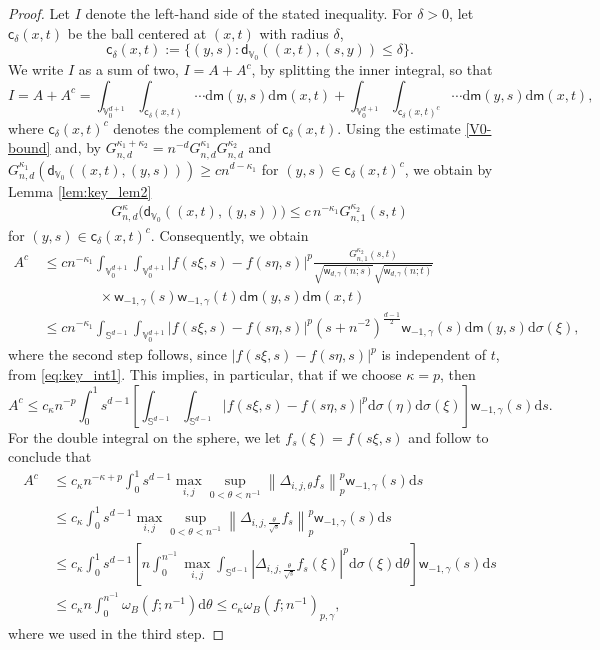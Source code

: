 \documentclass{amsart}
\theoremstyle{remark}
\def\d{\mathrm{d}}
\def\sph{{\mathbb{S}^{d-1}}}
\def\g{{\gamma}}
\def\k{{\kappa}}
\def\t{{\theta}}
\def\s{\sigma}
\def\VV{{\mathbb V}}
\def\d{\mathrm{d}}
\def\sph{{\mathbb{S}^{d-1}}}
\def\sc{{\mathsf c}}
\def\sd{{\mathsf d}}
\def\sm{{\mathsf m}}
\def\sw{{\mathsf w}}
\def\g{{\gamma}}
\def\k{{\kappa}}
\def\t{{\theta}}
\def\s{\sigma}
\def\VV{{\mathbb V}}
\def\f{\frac}
\def\f{\frac}
\begin{document}
\begin{proof}
Let $I$ denote the left-hand side of the stated inequality. For $\delta > 0$, let $\sc_\delta(x,t)$ be the ball
centered at $(x,t)$ with radius $\delta$, 
$$\sc_\delta(x,t):= \{(y,s): \sd_{\VV_0}((x,t), (s,y))\le \delta\}.
$$
We write $I$ as a sum of two, $I = A+A^c$, by splitting the inner integral, so that 
$$
   I = A + A^c = \int_{\VV_0^{d+1}}  \int_{\sc_\delta (x,t)} \cdots \d\sm(y,s)  \d \sm(x,t)+ 
      \int_{\VV_0^{d+1}} \int_{\sc_\delta (x,t)^c} \cdots \d\sm(y,s)   \d \sm(x,t),
$$
where $\sc_\delta (x,t)^c$ denotes the complement of $\sc_\delta (x,t)$. Using the estimate \eqref{V0-bound}
and, by $G_{n,d}^{\k_1+\k_2} =  n^{-d} G_{n,d}^{\k_1} G_{n,d}^{\k_2}$ and 
$G_{n,d}^{\k_1} ( \sd_{\VV_0}((x,t), (y,s))) \ge c n^{d-\k_1}$ for $(y,s) \in \sc_\delta (x,t)^c$,  we obtain by
Lemma \ref{lem:key_lem2}  
\begin{align*}
  G_{n,d}^\k \big( \sd_{\VV_0}((x,t), (y,s)) \big) \le c\, n^{-\k_1} G_{n,1}^{\k_2}(s,t)
\end{align*}
for $(y,s) \in \sc_\delta (x,t)^c$. Consequently, we obtain 
\begin{align*}
A^c \, & \le  c n^{-\k_1}  \int_{\VV_0^{d+1}} \int_{\VV_{0}^{d+1}} 
            |f(s\xi,s) - f(s\eta,s)|^p  \frac{G_{n,1}^{\k_2}(s,t)}{ \sqrt{ \sw_{d,\g}(n;s)}\sqrt{\sw_{d,\g}(n;t)}} \\
    & \qquad\qquad \times  \sw_{-1,\gamma}(s) \sw_{-1,\gamma}(t)\d \sm(y,s) \d \sm(x,t) \\
     & \le  c n^{-\k_1} 
   \int_{\sph} \int_{\VV_{0}^{d+1}}  |f(s\xi,s) - f(s\eta,s)|^p (s+n^{-2})^{\f{d-1}{2}}   \sw_{-1,\gamma}(s) \d \sm(y,s) \d \s(\xi),
\end{align*}
where the second step follows, since $|f(s\xi,s) - f(s\eta,s)|^p$ is independent of $t$, from \eqref{eq:key_int1}. 
This implies, in particular, that if we choose $\k = p$, then 
$$
  A^c \le c_\k n^{-p} \int_{0}^1s^{d-1} \left[ \int_{\sph} \int_{\sph}  |f(s\xi,s) - f(s\eta,s)|^p  \d \s(\eta) \d \s(\xi) \right] \sw_{-1,\gamma}(s) \d s.
$$ 
For the double integral on the sphere, we let $f_s (\xi) = f(s \xi,s)$ and follow \cite[p. 90]{DaiX} to conclude that 
\begin{align*}
  A^c \, & \le c_\k n^{-\k+p} \int_0^1 s^{d-1} \max_{i, j} \sup_{0< \t<n^{-1}} \left\| \Delta_{i,j,\t} f_s \right\|_p^p \sw_{-1,\g}(s) \d s \\
   & \le c_\k   \int_0^1 s^{d-1} \max_{i, j} \sup_{0< \t<n^{-1}} \left\| \Delta_{i,j,\frac{\t}{\sqrt{s}}} f_s \right\|_p^p \sw_{-1,\g}(s) \d s \\
    & \le c_\k  \int_0^1 s^{d-1} \left[n \int_0^{n^{-1}} \max_{i,j} \int_\sph |\Delta_{i,j,\frac{\t}{\sqrt{s}}} 
         f_s(\xi)|^p \d \s(\xi) \d \t \right]  \sw_{-1,\g}(s) \d s \\
    & \le c_\k   n \int_0^{n^{-1}} \omega_B(f;n^{-1}) \d \t \le c_\k \omega_B(f; n^{-1})_{p,\g},
\end{align*}
where we used \cite[Lemma 4.2.2 (iv)]{DaiX} in the third step. %


\end{proof}
\end{document}
